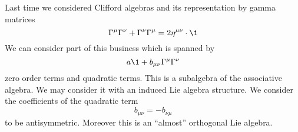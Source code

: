 Last time we considered Clifford algebras and its representation
by gamma matrices
\begin{equation}
\Gamma^{\mu}\Gamma^{\nu}+\Gamma^{\nu}\Gamma^{\mu}=2\eta^{\mu\nu}\cdot\1
\end{equation}
We can consider part of this business which is spanned by
\begin{equation}
a\1 + b_{\mu\nu}\Gamma^{\mu}\Gamma^{\nu}
\end{equation}
zero order terms and quadratic terms. This is a subalgebra of the
associative algebra. We may consider it with an induced Lie
algebra structure. We consider the coefficients of the quadratic
term
\begin{equation}
b_{\mu\nu}=-b_{\nu\mu}
\end{equation}
to be antisymmetric. Moreover this is an ``almost'' orthogonal
Lie algebra.

